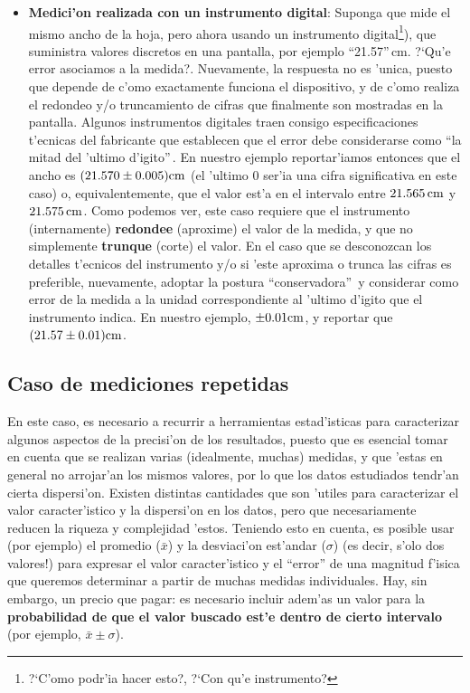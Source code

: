 \begin{itemize}
\item \textbf{Medici'on realizada con un instrumento digital}: Suponga que mide el mismo ancho de la hoja, pero ahora usando un instrumento digital\footnote{?`C'omo podr'ia hacer esto?, ?`Con qu'e instrumento?}), que suministra valores discretos en una pantalla, por ejemplo ``21.57''\,cm. ?`Qu'e error asociamos a la medida?. Nuevamente, la respuesta no es 'unica, puesto que depende de c'omo exactamente funciona el dispositivo, y de c'omo realiza el redondeo y/o truncamiento de cifras que finalmente son mostradas en la pantalla. Algunos instrumentos digitales traen consigo especificaciones t'ecnicas del fabricante que establecen que el error debe considerarse como ``la mitad del 'ultimo d'igito''\,. En nuestro ejemplo reportar'iamos entonces que el ancho es $(21.570\pm 0.005)\rm cm$ (el 'ultimo 0 ser'ia una cifra significativa en este caso) o, equivalentemente, que el valor est'a en el intervalo entre $21.565\,\rm cm$ y $21.575\,\rm cm$. Como podemos ver, este caso requiere que el instrumento (internamente) \textbf{redondee} (aproxime) el valor de la medida, y que no simplemente \textbf{trunque} (corte) el valor. En el caso que se desconozcan los detalles t'ecnicos del instrumento y/o si 'este aproxima o trunca las cifras es preferible, nuevamente, adoptar la postura ``conservadora''\, y considerar como error de la medida a la unidad correspondiente al 'ultimo d'igito que el instrumento indica. En nuestro ejemplo, $\pm 0.01\rm cm$, y reportar que $(21.57\pm 0.01)\rm cm$.
\end{itemize}

\subsection{Caso de mediciones repetidas}

En este caso, es necesario a recurrir a herramientas estad'isticas para caracterizar algunos aspectos de la precisi'on de los resultados, puesto que es esencial tomar en cuenta que se realizan varias (idealmente, muchas) medidas, y que 'estas en general no arrojar'an los mismos valores, por lo que los datos estudiados tendr'an cierta dispersi'on. Existen distintas cantidades que son 'utiles para caracterizar el valor caracter'istico y la dispersi'on en los datos, pero que necesariamente reducen la riqueza y complejidad 'estos. Teniendo esto en cuenta, es posible usar (por ejemplo) el promedio ($\bar{x}$) y la desviaci'on est'andar ($\sigma$) (es decir, s'olo dos valores!) para expresar el valor caracter'istico y el ``error'' de una magnitud f'isica que queremos determinar a partir de muchas medidas individuales. Hay, sin embargo, un precio que pagar: es necesario incluir adem'as un valor para la \textbf{probabilidad de que el valor buscado est'e dentro de cierto intervalo} (por ejemplo, $\bar{x}\pm \sigma$).

